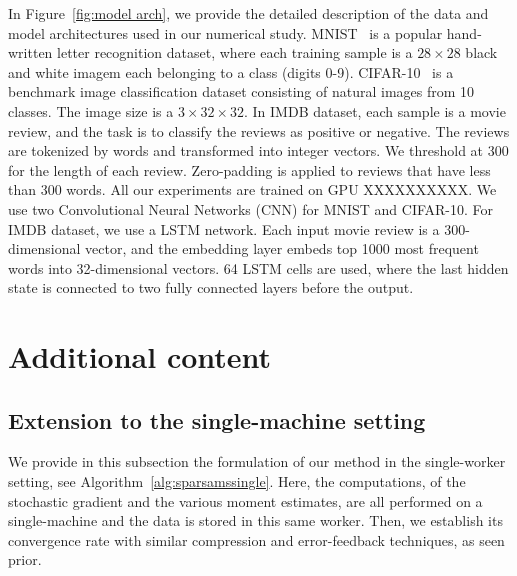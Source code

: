 \documentclass[11pt]{article}
\begin{document}
In Figure~\ref{fig:model arch}, we provide the detailed description of the data and model architectures used in our numerical study. MNIST~\cite{mnist} is a popular hand-written letter recognition dataset, where each training sample is a $28\times 28$ black and white imagem each belonging to a class (digits 0-9). CIFAR-10~\cite{cifar} is a benchmark image classification dataset consisting of natural images from 10 classes. The image size is a $3\times 32\times 32$. In IMDB dataset, each sample is a movie review, and the task is to classify the reviews as positive or negative. The reviews are tokenized by words and transformed into integer vectors. We threshold at 300 for the length of each review. Zero-padding is applied to reviews that have less than 300 words. All our experiments are trained on GPU XXXXXXXXXX. We use two Convolutional Neural Networks (CNN) for MNIST and CIFAR-10. For IMDB dataset, we use a LSTM network. Each input movie review is a 300-dimensional vector, and the embedding layer embeds top 1000 most frequent words into 32-dimensional vectors. 64 LSTM cells are used, where the last hidden state is connected to two fully connected layers before the output.



\clearpage

\section{Additional content}\label{app:add}

\subsection{Extension to the single-machine setting}

We provide in this subsection the formulation of our method in the single-worker setting, see Algorithm~\ref{alg:sparsamssingle}.
Here, the computations, of the stochastic gradient and the various moment estimates, are all performed on a single-machine and the data is stored in this same worker.
Then, we establish its convergence rate with similar compression and error-feedback techniques, as seen prior.
\end{document}
